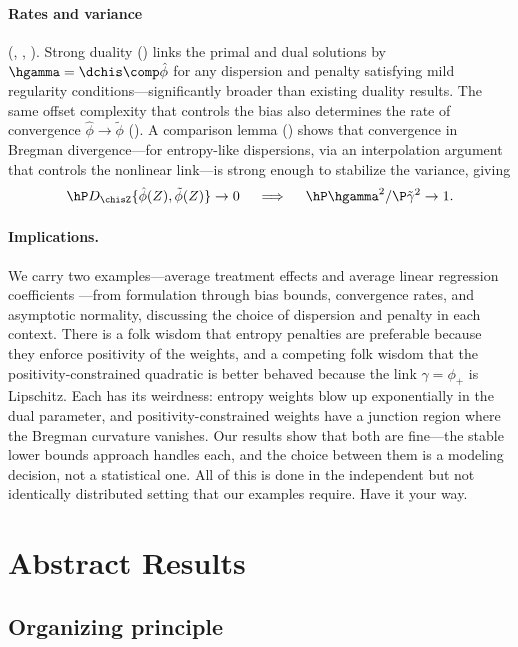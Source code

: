 \documentclass{article}
\begin{document}
\paragraph{Rates and variance}
(,
,
).
Strong duality
()
links the primal and dual solutions
by $\hgamma = \dchis \comp \hat\phi$
for any dispersion and penalty
satisfying mild regularity conditions---significantly
broader than existing duality results.
The same offset complexity
that controls the bias
also determines the rate of convergence
$\hat\phi \to \tilde\phi$
().
A comparison lemma
()
shows that convergence
in Bregman divergence---for
entropy-like dispersions,
via an interpolation argument
that controls the nonlinear link---is
strong enough to stabilize the variance,
giving
\[
\hP D_{\chisZ}\{\hat\phi(Z), \tilde\phi(Z)\} \to 0
\quad\implies\quad
\hP \hgamma^2 / \P \tilde\gamma^2 \to 1.
\]

\paragraph{Implications.}
We carry two examples---average
treatment effects
and average linear regression coefficients
\citep{graham2022semiparametrically}---from
formulation through
bias bounds, convergence rates,
and asymptotic normality,
discussing the choice of dispersion
and penalty in each context.
There is a folk wisdom
that entropy penalties are preferable
because they enforce positivity of the weights,
and a competing folk wisdom
that the positivity-constrained quadratic
is better behaved
because the link $\gamma = \phi_+$ is Lipschitz.
Each has its weirdness:
entropy weights blow up exponentially
in the dual parameter,
and positivity-constrained weights
have a junction region
where the Bregman curvature vanishes.
Our results show that both are fine---the
stable lower bounds approach handles each,
and the choice between them
is a modeling decision, not a statistical one.
All of this is done in the independent
but not identically distributed setting
that our examples require.
Have it your way.

\section{Abstract Results}
\label{sec:results}
\label{sec:statistical-considerations}

\subsection{Organizing principle}
\label{sec:organizing-principle}
\end{document}
